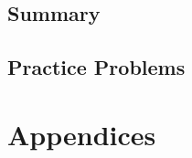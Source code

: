 \documentclass[oneside]{book}
\numberwithin{equation}{section}
\begin{document}
\subsection{Summary}

\subsection{Practice Problems}


\section{Appendices}


\printbibliography[heading=bibintoc]
	
\end{document}
